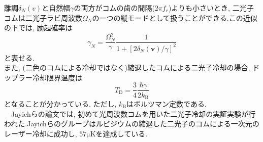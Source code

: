 \documentclass[uplatex, dvipdfmx, a4paper, report, papersize, 11pt]{jsbook}
\begin{document}
離調$\delta _{N}\left( v\right)$と自然幅$\gamma$の両方がコムの歯の間隔($2\pi f_r$)よりも小さいとき, 二光子コムは二光子ラビ周波数$\Omega_N$の一つの縦モードとして扱うことができる.この近似の下では, 励起確率は
\begin{equation}\label{EffectiveExcitationRate}
\gamma_N = \frac{\Omega^2_N}{\gamma}\frac{1}{1 + [2\delta_N(\bm{v})/\gamma]^2}
\end{equation}
と表せる.\\
 また, (二色のコムによる冷却ではなく)縮退したコムによる二光子冷却の場合, ドップラー冷却限界温度は
\begin{equation}
  T_\mathrm{D} = \frac{3}{4}\frac{\hbar\gamma}{2k_\mathrm{B}}
\end{equation}
となることが分かっている. ただし, $k_\mathrm{B}$はボルツマン定数である. \\
　Jayichらの論文\cite{PhysRevX.6.041004}では, 初めて光周波数コムを用いた二光子冷却の実証実験が行われた.Jayichらのグループはルビジウムの縮退した二光子のコムによる一次元のレーザー冷却に成功し, $57 \mathrm{\mu K}$を達成している.
\end{document}

